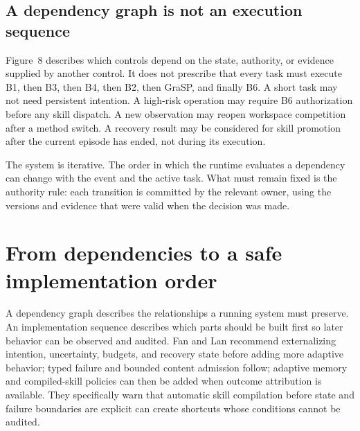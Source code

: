 \subsection{A dependency graph is not an execution sequence}
\label{subsec:ch18-dependency-not-sequence}

Figure~8 describes which controls depend on the state, authority, or evidence supplied by another control. It does not prescribe that every task must execute B1, then B3, then B4, then B2, then GraSP, and finally B6. A short task may not need persistent intention. A high-risk operation may require B6 authorization before any skill dispatch. A new observation may reopen workspace competition after a method switch. A recovery result may be considered for skill promotion after the current episode has ended, not during its execution.

The system is iterative. The order in which the runtime evaluates a dependency can change with the event and the active task. What must remain fixed is the authority rule: each transition is committed by the relevant owner, using the versions and evidence that were valid when the decision was made.


\section{From dependencies to a safe implementation order}
\label{sec:ch18-implementation-order}

A dependency graph describes the relationships a running system must preserve. An implementation sequence describes which parts should be built first so later behavior can be observed and audited. Fan and Lan recommend externalizing intention, uncertainty, budgets, and recovery state before adding more adaptive behavior; typed failure and bounded content admission follow; adaptive memory and compiled-skill policies can then be added when outcome attribution is available. They specifically warn that automatic skill compilation before state and failure boundaries are explicit can create shortcuts whose conditions cannot be audited.

